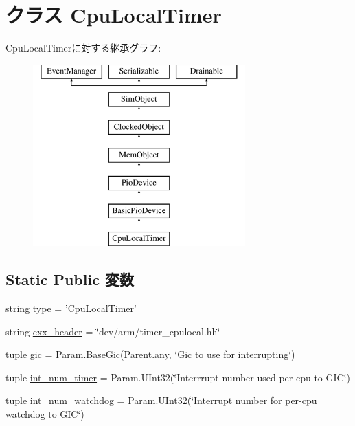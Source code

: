 \hypertarget{classRealView_1_1CpuLocalTimer}{
\section{クラス CpuLocalTimer}
\label{classRealView_1_1CpuLocalTimer}
}
CpuLocalTimerに対する継承グラフ:\begin{figure}[H]
\begin{center}
\leavevmode
\includegraphics[height=7cm]{classRealView_1_1CpuLocalTimer}
\end{center}
\end{figure}
\subsection*{Static Public 変数}
\begin{DoxyCompactItemize}
\item 
string \hyperlink{classRealView_1_1CpuLocalTimer_acce15679d830831b0bbe8ebc2a60b2ca}{type} = '\hyperlink{classRealView_1_1CpuLocalTimer}{CpuLocalTimer}'
\item 
string \hyperlink{classRealView_1_1CpuLocalTimer_a17da7064bc5c518791f0c891eff05fda}{cxx\_\-header} = \char`\"{}dev/arm/timer\_\-cpulocal.hh\char`\"{}
\item 
tuple \hyperlink{classRealView_1_1CpuLocalTimer_a40243beb62d217c3a9e35801ae739fd0}{gic} = Param.BaseGic(Parent.any, \char`\"{}Gic to use for interrupting\char`\"{})
\item 
tuple \hyperlink{classRealView_1_1CpuLocalTimer_a41d80387d29e486234ca29aa8a7b1a79}{int\_\-num\_\-timer} = Param.UInt32(\char`\"{}Interrrupt number used per-\/cpu to GIC\char`\"{})
\item 
tuple \hyperlink{classRealView_1_1CpuLocalTimer_ac9a716c5fa1dc45c2d9302efdab478f1}{int\_\-num\_\-watchdog} = Param.UInt32(\char`\"{}Interrupt number for per-\/cpu watchdog to GIC\char`\"{})
\end{DoxyCompactItemize}


